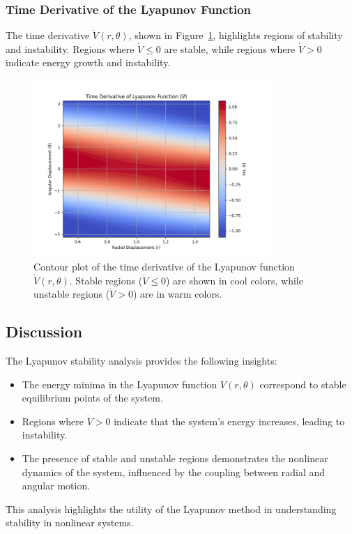 \documentclass[12pt]{article}
\begin{document}
\subsubsection{Time Derivative of the Lyapunov Function}
The time derivative \( \dot{V}(r, \theta) \), shown in Figure~\ref{fig:lyapunov_derivative}, highlights regions of stability and instability. Regions where \( \dot{V} \leq 0 \) are stable, while regions where \( \dot{V} > 0 \) indicate energy growth and instability.

\begin{figure}[h!]
    \centering
    \includegraphics[width=0.8\textwidth]{lyapunov_derivative.png}
    \caption{Contour plot of the time derivative of the Lyapunov function \( \dot{V}(r, \theta) \). Stable regions (\( \dot{V} \leq 0 \)) are shown in cool colors, while unstable regions (\( \dot{V} > 0 \)) are in warm colors.}
    \label{fig:lyapunov_derivative}
\end{figure}

\subsection{Discussion}
The Lyapunov stability analysis provides the following insights:
\begin{itemize}
    \item The energy minima in the Lyapunov function \( V(r, \theta) \) correspond to stable equilibrium points of the system.
    \item Regions where \( \dot{V} > 0 \) indicate that the system's energy increases, leading to instability.
    \item The presence of stable and unstable regions demonstrates the nonlinear dynamics of the system, influenced by the coupling between radial and angular motion.
\end{itemize}
This analysis highlights the utility of the Lyapunov method in understanding stability in nonlinear systems.
\end{document}
